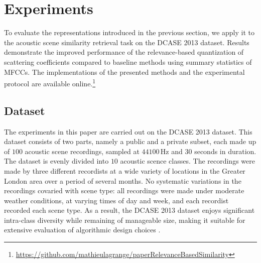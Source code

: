 \documentclass[smallextended]{svjour3}
\newcommand{\ja}[1]{\textcolor{magenta}{Joakim : #1}}
\begin{document}
\section{Experiments}
\label{sec:experiments}

To evaluate the representations introduced in the previous section, we apply it to the acoustic scene similarity retrieval task on the DCASE 2013 dataset.
Results demonstrate the improved performance of the relevance-based quantization of scattering coefficients compared to baseline methods using summary statistics of MFCCs.
The implementations of the presented methods and the experimental protocol are available online.\footnote{\url{https://github.com/mathieulagrange/paperRelevanceBasedSimilarity}} %


\subsection{Dataset}

The experiments in this paper are carried out on the DCASE 2013 \cite{7100934} dataset.
This dataset consists of two parts, namely a public and a private subset, each made up of $100$ acoustic scene recordings, sampled at $44100\,\mathrm{Hz}$ and $30$ seconds in duration. The dataset is evenly divided into $10$ acoustic scence classes. The recordings were made by three different recordists at a wide variety of locations in the Greater London area over a period of several months. No
systematic variations in the recordings covaried with scene
type: all recordings were made under moderate weather conditions, at varying times of day and week, and each recordist recorded each scene type. As a result, the DCASE 2013 dataset enjoys significant intra-class diversity while remaining of manageable size, making it suitable for extensive evaluation of algorithmic design choices \cite{lagrange:hal-01082501}.
\end{document}
